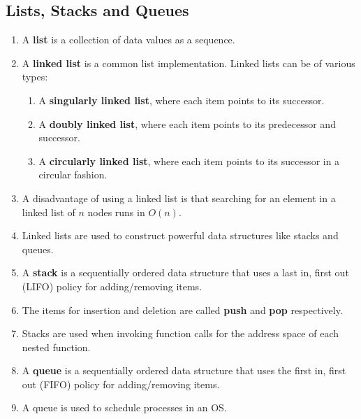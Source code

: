 \documentclass[journal,12pt,twocolumn]{IEEEtran}
\begin{document}
\subsection{Lists, Stacks and Queues}
\begin{enumerate}
    \item A \textbf{list} is a collection of data values as a sequence.
    \item A \textbf{linked list} is a common list implementation. Linked lists 
    can be of various types:
    \begin{enumerate}
        \item A \textbf{singularly linked list}, where each item points to its 
        successor.
        \item A \textbf{doubly linked list}, where each item points to its
        predecessor and successor.
        \item A \textbf{circularly linked list}, where each item points to its 
        successor in a circular fashion.
    \end{enumerate}
    \item A disadvantage of using a linked list is that searching for an element
    in a linked list of $n$ nodes runs in $O(n)$.
    \item Linked lists are used to construct powerful data structures like stacks 
    and queues.
    \item A \textbf{stack} is a sequentially ordered data structure that uses 
    a last in, first out (LIFO) policy for adding/removing items.
    \item The items for insertion and deletion are called \textbf{push} and 
    \textbf{pop} respectively.
    \item Stacks are used when invoking function calls for the address space 
    of each nested function.
    \item A \textbf{queue} is a sequentially ordered data structure that uses 
    the first in, first out (FIFO) policy for adding/removing items. 
    \item A queue is used to schedule processes in an OS.
\end{enumerate}
\end{document}
